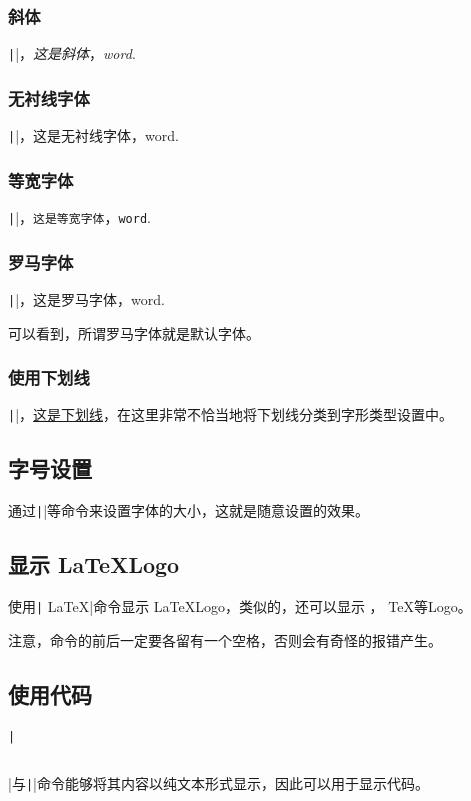 \documentclass[fontset=ubuntu]{ctexart}
\begin{document}
\subsubsection{斜体}
\texttt|\textit{}|，\textit{这是斜体}，\textit{word}.

\subsubsection{无衬线字体}
\texttt|\textsf{}|，\textsf{这是无衬线字体}，\textsf{word}.

\subsubsection{等宽字体}
\texttt|\texttt{}|，\texttt{这是等宽字体}，\texttt{word}.

\subsubsection{罗马字体}
\texttt|\textrm{}|，\textrm{这是罗马字体}，\textrm{word}.

可以看到，所谓罗马字体就是默认字体。

\subsubsection{使用下划线}
\texttt|\underline{}|，\underline{这是下划线}，在这里非常不恰当地将下划线分类到字形类型设置中。

\subsection{字号设置}
通过\texttt|\large|等命令来设置字体的大小，这就是{\large 随意}{\small 设置}{\tiny 的}{\Huge 效果}。

\subsection{显示 \LaTeX Logo}
使用\texttt| \LaTeX |命令显示 \LaTeX Logo，类似的，还可以显示 \LaTeXe ， \TeX 等Logo。

注意，命令的前后一定要各留有一个空格，否则会有奇怪的报错产生。

\subsection{使用代码}
\texttt|\begin{verbatim} \end{verbatim}|与\texttt|\verb|||命令能够将其内容以纯文本形式显示，因此可以用于显示代码。
\end{document}

